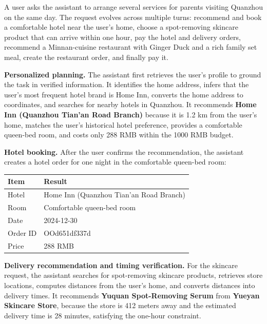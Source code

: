 \label{agentic_cases}

\begin{caseprompt}
A user asks the assistant to arrange several services for parents visiting Quanzhou on the same day. The request evolves across multiple turns: recommend and book a comfortable hotel near the user's home, choose a spot-removing skincare product that can arrive within one hour, pay the hotel and delivery orders, recommend a Minnan-cuisine restaurant with Ginger Duck and a rich family set meal, create the restaurant order, and finally pay it.
\end{caseprompt}

\begin{caseresponse}
\textbf{Personalized planning.} The assistant first retrieves the user's profile to ground the task in verified information. It identifies the home address, infers that the user's most frequent hotel brand is Home Inn, converts the home address to coordinates, and searches for nearby hotels in Quanzhou. It recommends \textbf{Home Inn (Quanzhou Tian'an Road Branch)} because it is 1.2 km from the user's home, matches the user's historical hotel preference, provides a comfortable queen-bed room, and costs only 288 RMB within the 1000 RMB budget.

\textbf{Hotel booking.} After the user confirms the recommendation, the assistant creates a hotel order for one night in the comfortable queen-bed room:
\begin{center}
\begin{tabular}{ll}
\toprule
\textbf{Item} & \textbf{Result} \\
\midrule
Hotel & Home Inn (Quanzhou Tian'an Road Branch) \\
Room & Comfortable queen-bed room \\
Date & 2024-12-30 \\
Order ID & OOd651df337d \\
Price & 288 RMB \\
\bottomrule
\end{tabular}
\end{center}

\textbf{Delivery recommendation and timing verification.} For the skincare request, the assistant searches for spot-removing skincare products, retrieves store locations, computes distances from the user's home, and converts distances into delivery times. It recommends \textbf{Yuquan Spot-Removing Serum} from \textbf{Yueyan Skincare Store}, because the store is 412 meters away and the estimated delivery time is 28 minutes, satisfying the one-hour constraint.


\end{caseresponse}
